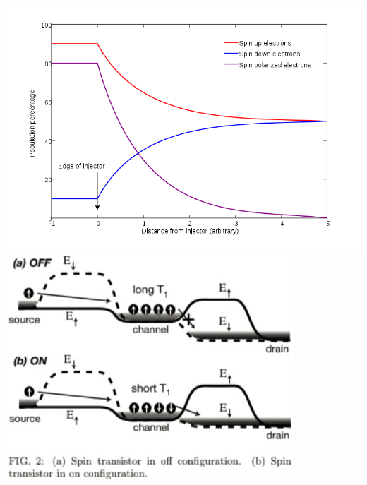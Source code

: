 \documentclass{article}
\begin{document}
\begin{center}
\includegraphics[scale=0.3]{768px-Spin_Injection.svg.png}
\includegraphics[scale=0.8]{Annotation 2020-10-30 104714.jpg}
\end{center}
\end{document}
